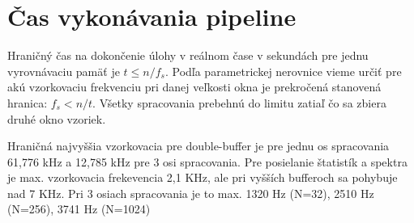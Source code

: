 \section{Čas vykonávania pipeline}
Hraničný čas na dokončenie úlohy v reálnom čase v sekundách pre jednu vyrovnávaciu pamäť je $t \leq n / f_s$.
Podľa parametrickej nerovnice vieme určiť pre akú vzorkovaciu frekvenciu pri danej veľkosti okna je prekročená stanovená hranica:
$ f_s < n / t $. Všetky spracovania prebehnú do limitu zatiaľ čo sa zbiera druhé okno vzoriek. 

Hraničná najvyššia vzorkovacia pre double-buffer je pre jednu os spracovania 61,776 kHz a 12,785 kHz pre 3 osi spracovania.
Pre posielanie štatistík a spektra je max. vzorkovacia frekevencia 2,1 KHz, ale pri vyšších bufferoch sa pohybuje nad 7 KHz.
Pri 3 osiach spracovania je to max. 1320 Hz (N=32), 2510 Hz (N=256), 3741 Hz (N=1024)

